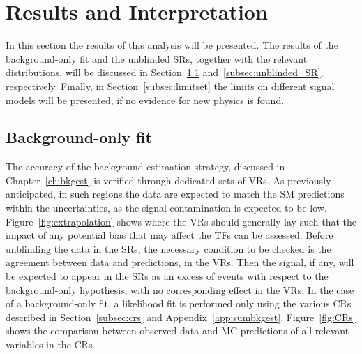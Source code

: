 	\section{Results and Interpretation}
	\label{sec:results}

		In this section the results of this analysis will be presented. The results of the background-only fit and the unblinded \acp{SR}, together with the relevant distributions, will be discussed in Section~\ref{subsec:bkgonly_fit} and~\ref{subsec:unblinded_SR}, respectively. Finally, in Section~\ref{subsec:limitset} the limits on different signal models will be presented, if no evidence for new physics is found.

 		\subsection{Background-only fit}
 		\label{subsec:bkgonly_fit}

 			The accuracy of the background estimation strategy, discussed in Chapter~\ref{ch:bkgest} is verified through dedicated sets of \acp{VR}. As previously anticipated, in such regions the data are expected to match the \ac{SM} predictions within the uncertainties, as the signal contamination is expected to be low. Figure~\ref{fig:extrapolation} shows where the VRs should generally lay such that the impact of any potential bias that may affect the \acp{TF} can be assessed. Before unblinding the data in the \acp{SR}, the necessary condition to be checked is the agreement between data and predictions, in the \acp{VR}. Then the signal, if any, will be expected to appear in the \acp{SR} as an excess of events with respect to the background-only hypothesis, with no corresponding effect in the \acp{VR}. In the case of a background-only fit, a likelihood fit is performed only using the various \acp{CR} described in Section~\ref{subsec:crs} and Appendix~\ref{app:sumbkgest}. Figure~\ref{fig:CRs} shows the comparison between observed data and \ac{MC} predictions of all relevant variables in the \acp{CR}.
		
